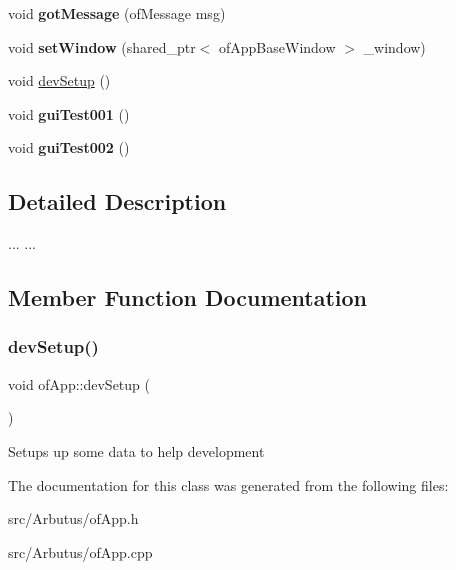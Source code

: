 \begin{DoxyCompactItemize}
\item 
\mbox{\label{classof_app_a885672a72340a5e998af1d16718dc766}} 
void {\bfseries got\+Message} (of\+Message msg)
\item 
\mbox{\label{classof_app_ad5f9f67e8e69719da2b6c84a87a4ed37}} 
void {\bfseries set\+Window} (shared\+\_\+ptr$<$ of\+App\+Base\+Window $>$ \+\_\+window)
\item 
void \mbox{\hyperlink{classof_app_a04de4f6a3bd5ea22045d041097009f1b}{dev\+Setup}} ()
\item 
\mbox{\label{classof_app_a6ee1a7af6a715c6448f9769ff22cbabc}} 
void {\bfseries gui\+Test001} ()
\item 
\mbox{\label{classof_app_ad561e567741c5979497091b4ce6c1517}} 
void {\bfseries gui\+Test002} ()
\end{DoxyCompactItemize}


\subsection{Detailed Description}
...  ... 

\subsection{Member Function Documentation}
\mbox{\label{classof_app_a04de4f6a3bd5ea22045d041097009f1b}} 
\subsubsection{\texorpdfstring{dev\+Setup()}{devSetup()}}
{\footnotesize\ttfamily void of\+App\+::dev\+Setup (\begin{DoxyParamCaption}{ }\end{DoxyParamCaption})}

Setups up some data to help development 

The documentation for this class was generated from the following files\+:\begin{DoxyCompactItemize}
\item 
src/\+Arbutus/of\+App.\+h\item 
src/\+Arbutus/of\+App.\+cpp\end{DoxyCompactItemize}
